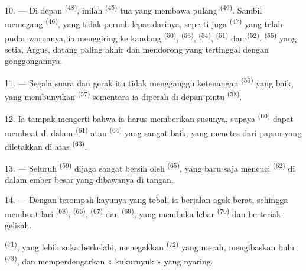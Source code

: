 10. --- Di depan  \textsuperscript{(48)}, inilah
 \textsuperscript{(45)} tua yang membawa pulang
 \textsuperscript{(49)}. Sambil memegang
 \textsuperscript{(46)}, yang tidak pernah lepas
darinya, seperti juga  \textsuperscript{(47)} yang
telah pudar warnanya, ia menggiring ke kandang  \textsuperscript{(50)}, 
\textsuperscript{(53)}, 
\textsuperscript{(54)}, 
\textsuperscript{(51)} dan 
\textsuperscript{(52)}.  \textsuperscript{(55)} yang
setia, Argus, datang paling akhir dan mendorong yang tertinggal dengan
gonggongannya.

11. --- Segala suara dan gerak itu tidak mengganggu ketenangan
 \textsuperscript{(56)} yang baik, yang
membunyikan  \textsuperscript{(57)} sementara
ia diperah di depan pintu  \textsuperscript{(58)}.

12. Ia tampak mengerti bahwa ia harus memberikan susunya, supaya
 \textsuperscript{(60)} dapat membuat
 di dalam 
\textsuperscript{(61)} atau  \textsuperscript{(64)} yang
sangat baik, yang menetes dari papan yang diletakkan di atas
 \textsuperscript{(63)}.

13. --- Seluruh  \textsuperscript{(59)} dijaga
sangat bersih oleh  \textsuperscript{(65)}, yang baru
saja mencuci  \textsuperscript{(62)} di
dalam ember besar yang dibawanya di tangan.

\VUsaut{3.0mm}
\VUsaut{3.0mm}

14. --- Dengan terompah kayunya yang tebal, ia berjalan agak berat,
sehingga membuat lari  \textsuperscript{(68)},
 \textsuperscript{(66)},  \textsuperscript{(67)} dan 
\textsuperscript{(69)}, yang membuka lebar 
\textsuperscript{(70)} dan berteriak gelisah.

 \textsuperscript{(71)}, yang lebih suka berkelahi,
menegakkan  \textsuperscript{(72)} yang merah,
mengibaskan bulu  \textsuperscript{(73)}, dan
memperdengarkan « kukuruyuk » yang nyaring.

